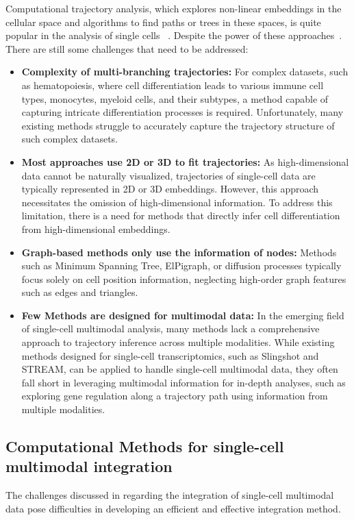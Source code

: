 Computational trajectory analysis, which explores non-linear embeddings in the cellular space and algorithms to find paths or trees in these spaces, is quite popular in the analysis of single cells ~\citep{wolf2019paga,chen2019stream,street2018slingshot,Lynch2022}. Despite the power of these approaches~\cite{Saelens2019}. There are still some challenges that need to be addressed:

\begin{itemize}
	\item \textbf{Complexity of multi-branching trajectories:} 
	For complex datasets, such as hematopoiesis, where cell differentiation leads to various immune cell types, monocytes, myeloid cells, and their subtypes, a method capable of capturing intricate differentiation processes is required. Unfortunately, many existing methods struggle to accurately capture the trajectory structure of such complex datasets.

	\item \textbf{Most approaches use 2D or 3D to fit trajectories:} 
	As high-dimensional data cannot be naturally visualized, trajectories of single-cell data are typically represented in 2D or 3D embeddings. However, this approach necessitates the omission of high-dimensional information. To address this limitation, there is a need for methods that directly infer cell differentiation from high-dimensional embeddings. 

	\item \textbf{Graph-based methods only use the information of nodes:} 
	Methods such as Minimum Spanning Tree, ElPigraph, or diffusion processes typically focus solely on cell position information, neglecting high-order graph features such as edges and triangles.   

	\item \textbf{Few Methods are designed for multimodal data:} 
	In the emerging field of single-cell multimodal analysis, many methods lack a comprehensive approach to trajectory inference across multiple modalities. While existing methods designed for single-cell transcriptomics, such as Slingshot and STREAM, can be applied to handle single-cell multimodal data, they often fall short in leveraging multimodal information for in-depth analyses, such as exploring gene regulation along a trajectory path using information from multiple modalities.
\end{itemize}


\subsection{Computational Methods for single-cell multimodal integration}
\label{background:sec2:integration}
The challenges discussed in  regarding the integration of single-cell multimodal data pose difficulties in developing an efficient and effective integration method. 

